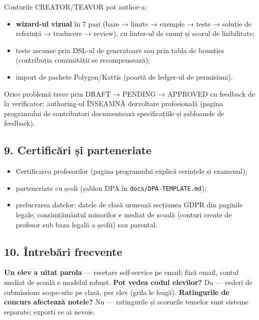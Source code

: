 \documentclass[
]{article}
\providecommand{\tightlist}{%
  \setlength{\itemsep}{0pt}\setlength{\parskip}{0pt}}
\begin{document}
Conturile CREATOR/TEAVOR pot author-a:

\begin{itemize}
\tightlist
\item
  \textbf{wizard-ul vizual} în 7 pași (baze → limite → exemple → teste →
  soluție de referință → traducere → review), cu linter-ul de enunț și
  scorul de lizibilitate;
\item
  teste ascunse prin DSL-ul de generatoare sau prin tabla de bounties
  (contribuția comunității se recompensează);
\item
  import de pachete Polygon/Kattis (poartă de ledger-ul de permisiuni).
\end{itemize}

Orice problemă trece prin DRAFT → PENDING → APPROVED cu feedback de la
verificator; authoring-ul ÎNSEAMNĂ dezvoltare profesională (pagina
programului de contributori documentează specificațiile și șabloanele de
feedback).

\subsection{9. Certificări și
parteneriate}\label{9-certificux103ri-ux219i-parteneriate}

\begin{itemize}
\tightlist
\item
  Certificarea profesorilor (pagina programului explică cerințele și
  examenul);
\item
  parteneriate cu școli (șablon DPA în \texttt{docs/DPA-TEMPLATE.md});
\item
  prelucrarea datelor: datele de clasă urmează secțiunea GDPR din
  paginile legale; consimțământul minorilor e mediat de școală (conturi
  create de profesor sub baza legală a școlii) sau parental.
\end{itemize}

\subsection{10. Întrebări
frecvente}\label{10-uxeentrebux103ri-frecvente}

\textbf{Un elev a uitat parola} --- resetare self-service pe email; fără
email, contul mediat de școală e modelul robust. \textbf{Pot vedea codul
elevilor?} Da --- vederi de submissions scope-uite pe clasă, per elev
(grila le leagă). \textbf{Ratingurile de concurs afectează notele?} Nu
--- ratingurile și scorurile temelor sunt sisteme separate; exporti ce
ai nevoie.
\end{document}
